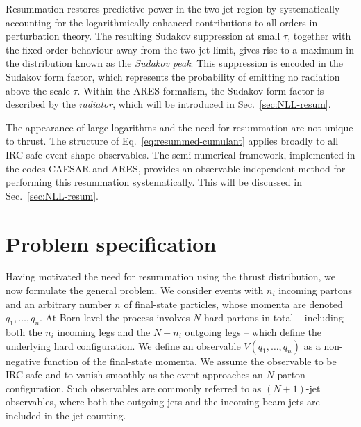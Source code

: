 Resummation restores predictive power in the two-jet region by
systematically accounting for the logarithmically enhanced contributions
to all orders in perturbation theory. The resulting Sudakov suppression
at small $\tau$, together with the fixed-order behaviour away from the
two-jet limit, gives rise to a maximum in the distribution known as the
\emph{Sudakov peak}. This suppression is encoded in the Sudakov form
factor, which represents the probability of emitting no radiation
above the scale $\tau$. Within the \textsc{ARES} formalism, the Sudakov
form factor is described by the \emph{radiator}, which will be introduced
in Sec.~\ref{sec:NLL-resum}.

The appearance of large logarithms and the need for resummation are not
unique to thrust. The structure of Eq.~\eqref{eq:resummed-cumulant} applies
broadly to all IRC safe event-shape observables. The semi-numerical 
framework, implemented in the codes \textsc{CAESAR} and \textsc{ARES}, 
provides an observable-independent method for performing this resummation 
systematically. This will be discussed in Sec.~\ref{sec:NLL-resum}.

\section{Problem specification}
\label{sec:problem-spec}

Having motivated the need for resummation using the thrust distribution,
we now formulate the general problem. We consider events with $n_i$ incoming partons and an arbitrary number $n$ of
final-state particles, whose momenta are denoted $q_1,\dots,q_n$.
At Born level the process involves $N$ hard partons in total -- including
both the $n_i$ incoming legs and the $N - n_i$ outgoing legs -- which define
the underlying hard configuration. We define an observable $V(q_1,\dots,q_n)$ as a non-negative function of
the final-state momenta. We assume the observable to be IRC safe and to vanish
smoothly as the event approaches an $N$-parton configuration.
Such observables are commonly referred to as $(N\!+\!1)$-jet observables,
where both the outgoing jets and the incoming beam jets are included in the
jet counting.

